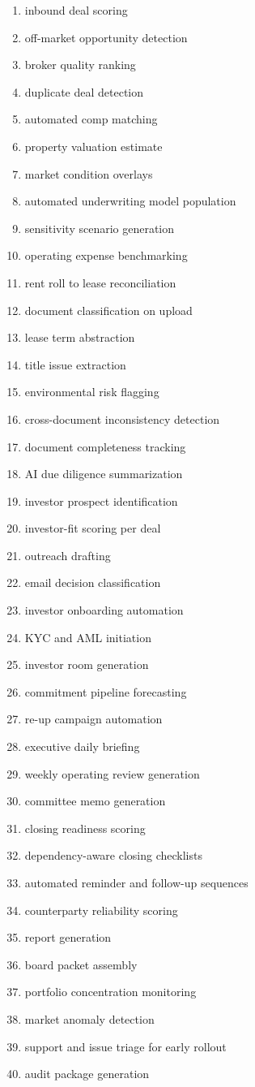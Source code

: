 \documentclass[11pt]{article}
\begin{document}
\begin{enumerate}
\item inbound deal scoring
\item off-market opportunity detection
\item broker quality ranking
\item duplicate deal detection
\item automated comp matching
\item property valuation estimate
\item market condition overlays
\item automated underwriting model population
\item sensitivity scenario generation
\item operating expense benchmarking
\item rent roll to lease reconciliation
\item document classification on upload
\item lease term abstraction
\item title issue extraction
\item environmental risk flagging
\item cross-document inconsistency detection
\item document completeness tracking
\item AI due diligence summarization
\item investor prospect identification
\item investor-fit scoring per deal
\item outreach drafting
\item email decision classification
\item investor onboarding automation
\item KYC and AML initiation
\item investor room generation
\item commitment pipeline forecasting
\item re-up campaign automation
\item executive daily briefing
\item weekly operating review generation
\item committee memo generation
\item closing readiness scoring
\item dependency-aware closing checklists
\item automated reminder and follow-up sequences
\item counterparty reliability scoring
\item report generation
\item board packet assembly
\item portfolio concentration monitoring
\item market anomaly detection
\item support and issue triage for early rollout
\item audit package generation
\end{enumerate}
\end{document}
